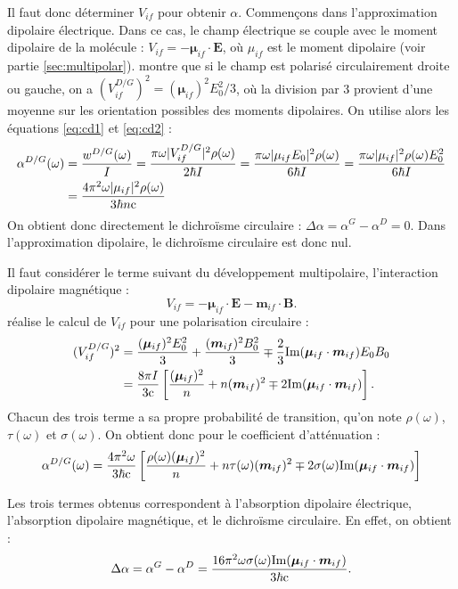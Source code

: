 Il faut donc déterminer $V_{if}$ pour obtenir $\alpha$. Commençons dans l'approximation dipolaire électrique. Dans ce cas, le champ électrique se couple avec le moment dipolaire de la molécule : $V_{if} = -\bm{\mu}_{if}\cdot \bm{E}$, où $\mu_{if}$ est le moment dipolaire (voir partie \ref{sec:multipolar}).  montre que si le champ est polarisé circulairement droite ou gauche, on a $(V_{if}^{D/G})^2 = (\bm{\mu}_{if})^2E^2_0/3$, où la division par 3 provient d'une moyenne sur les orientation possibles des moments dipolaires.
On utilise alors les équations \ref{eq:cd1} et \ref{eq:cd2} :
\begin{align*}
\alpha^{D/G}(\omega) &= \frac{w^{D/G}(\omega)}{I} = \frac{\pi \omega |V_{if}^{D/G}|^2 \rho(\omega)}{2\hbar I} 
= \frac{\pi \omega |\mu_{if}E_0|^2 \rho(\omega)}{6\hbar I} 
= \frac{\pi \omega |\mu_{if}|^2 \rho(\omega)E^2_0}{6\hbar I} \\
&= \frac{4\pi^2 \omega |\mu_{if}|^2 \rho(\omega)}{3\hbar n \mathrm{c}} 
\end{align*}
On obtient donc directement le dichroïsme circulaire : $\Delta\alpha = \alpha^G-\alpha^D = 0$. Dans l'approximation dipolaire, le dichroïsme circulaire est donc nul. \par Il faut considérer le terme suivant du développement multipolaire, l'interaction dipolaire magnétique : 
\[V_{if} = -\bm{\mu}_{if}\cdot \bm{E} - \bm{m}_{if}\cdot \bm{B}.\] 
 réalise le calcul de $V_{if}$ pour une polarisation circulaire :
\begin{align*}
(V_{if}^{D/G})^2 &= \frac{(\bm{\mu}_{if})^2E^2_0}{3}+\frac{(\bm{m}_{if})^2B^2_0}{3} \mp \frac{2}{3}\text{Im}(\bm{\mu}_{if}\cdot\bm{m}_{if})E_0B_0 \\
&= \frac{8\pi I}{3 \mathrm{c}}\left[\frac{(\bm{\mu}_{if})^2}{n} +  n(\bm{m}_{if})^2 \mp 2 \text{Im}(\bm{\mu}_{if}\cdot\bm{m}_{if})\right]. 
\end{align*}
Chacun des trois terme a sa propre probabilité de transition, qu'on note $\rho(\omega)$, $\tau(\omega)$ et $\sigma(\omega)$. On obtient donc pour le coefficient d'atténuation :
\begin{equation*}
\alpha^{D/G}(\omega) = \frac{4\pi^2 \omega}{3\hbar \mathrm{c}}\left[\frac{\rho(\omega)(\bm{\mu}_{if})^2}{n} +  n\tau(\omega)(\bm{m}_{if})^2 \mp 2 \sigma(\omega)\text{Im}(\bm{\mu}_{if}\cdot\bm{m}_{if})\right] 
\end{equation*}

Les trois termes obtenus correspondent à l'absorption dipolaire électrique, l'absorption dipolaire magnétique, et le dichroïsme circulaire. En effet, on obtient :
\[ \Delta \alpha = \alpha^G-\alpha^D = \frac{16\pi^2 \omega\sigma(\omega)\text{Im}(\bm{\mu}_{if}\cdot\bm{m}_{if})}{3\hbar \mathrm{c}}. \]